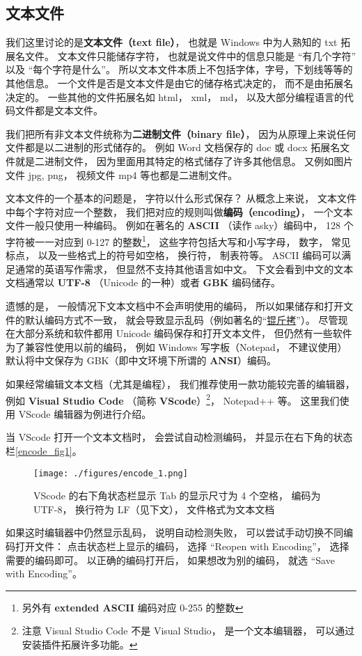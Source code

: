 
\subsection{文本文件}
我们这里讨论的是\textbf{文本文件（text file）}， 也就是 Windows 中为人熟知的 txt 拓展名文件。 文本文件只能储存字符， 也就是说文件中的信息只能是 “有几个字符” 以及 “每个字符是什么”。 所以文本文件本质上不包括字体，字号，下划线等等的其他信息。 一个文件是否是文本文件是由它的储存格式决定的， 而不是由拓展名决定的。 一些其他的文件拓展名如 html， xml， md， 以及大部分编程语言的代码文件都是文本文件。

我们把所有非文本文件统称为\textbf{二进制文件（binary file）}， 因为从原理上来说任何文件都是以二进制的形式储存的。 例如 Word 文档保存的 doc 或 docx 拓展名文件就是二进制文件， 因为里面用其特定的格式储存了许多其他信息。  又例如图片文件 jpg, png， 视频文件 mp4 等也都是二进制文件。

文本文件的一个基本的问题是， 字符以什么形式保存？ 从概念上来说， 文本文件中每个字符对应一个整数， 我们把对应的规则叫做\textbf{编码（encoding）}， 一个文本文件一般只使用一种编码。 例如在著名的 \textbf{ASCII} （读作 asky）编码中， 128 个字符被一一对应到 0-127 的整数\footnote{另外有 \textbf{extended ASCII} 编码对应 0-255 的整数}， 这些字符包括大写和小写字母， 数字， 常见标点， 以及一些格式上的符号如空格， 换行符， 制表符等。 ASCII 编码可以满足通常的英语写作需求， 但显然不支持其他语言如中文。 下文会看到中文的文本文档通常以 \textbf{UTF-8} （Unicode 的一种）或者 \textbf{GBK} 编码储存。

遗憾的是， 一般情况下文本文档中不会声明使用的编码， 所以如果储存和打开文件的默认编码方式不一致， 就会导致显示乱码（例如著名的“\href{https://baike.baidu.com/item/锟斤拷}{锟斤拷}”）。 尽管现在大部分系统和软件都用 Unicode 编码保存和打开文本文件， 但仍然有一些软件为了兼容性使用以前的编码， 例如 Windows 写字板（Notepad， 不建议使用）默认将中文保存为 GBK（即中文环境下所谓的 \textbf{ANSI}）编码。

如果经常编辑文本文档（尤其是编程）， 我们推荐使用一款功能较完善的编辑器， 例如 \textbf{Visual Studio Code} （简称 \textbf{VScode}）\footnote{注意 Visual Studio Code 不是 Visual Studio， 是一个文本编辑器， 可以通过安装插件拓展许多功能。}， Notepad++ 等。 这里我们使用 VScode 编辑器为例进行介绍。

当 VScode 打开一个文本文档时， 会尝试自动检测编码， 并显示在右下角的状态栏\autoref{encode_fig1}。
\begin{figure}[ht]
\centering
\texttt{[image: ./figures/encode\_1.png]}
\caption{VScode 的右下角状态栏显示 Tab 的显示尺寸为 4 个空格， 编码为 UTF-8， 换行符为 LF（见下文）， 文件格式为文本文档} \label{encode_fig1}
\end{figure}
如果这时编辑器中仍然显示乱码， 说明自动检测失败， 可以尝试手动切换不同编码打开文件： 点击状态栏上显示的编码， 选择 “Reopen with Encoding”， 选择需要的编码即可。 以正确的编码打开后， 如果想改为别的编码， 就选 “Save with Encoding”。

